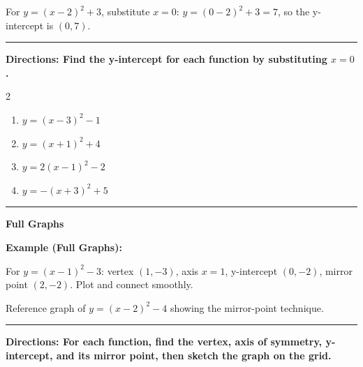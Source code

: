 \documentclass[12pt]{article}
\begin{document}
For $y=(x-2)^2+3$, substitute $x=0$: $y=(0-2)^2+3=7$, so the y-intercept is $(0,7)$.

\vspace{0.2cm}\hrule\vspace{0.35cm}
\textbf{Directions: Find the y-intercept for each function by substituting $x=0$.}

\begin{multicols}{2}
\begin{enumerate}[label=\textbf{\arabic*.}, start=5, itemsep=2cm]
  \item $\displaystyle y=(x-3)^2-1$
  \item $\displaystyle y=(x+1)^2+4$
  \item $\displaystyle y=2(x-1)^2-2$
  \item $\displaystyle y=-(x+3)^2+5$
\end{enumerate}
\end{multicols}
\vspace{0.25cm}\hrule\vspace{0.35cm}

\begin{center}{\Large \textbf{Full Graphs}}\end{center}\vspace{0.2cm}
\textbf{Example (Full Graphs):}

For $y=(x-1)^2-3$: vertex $(1,-3)$, axis $x=1$, y-intercept $(0,-2)$, mirror point $(2,-2)$. Plot and connect smoothly.

\begin{center}\end{center}
{\small\centering Reference graph of $y=(x-2)^2-4$ showing the mirror-point technique.\par}
\vspace{0.2cm}\hrule\vspace{0.35cm}
\textbf{Directions: For each function, find the vertex, axis of symmetry, y-intercept, and its mirror point, then sketch the graph on the grid.}
\end{document}

